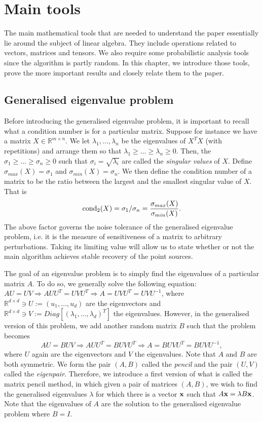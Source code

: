 \section{Main tools}
The main mathematical tools that are needed to understand the paper essentially lie around the subject of linear algebra. They include operations related to vectors, matrices and tensors. We also require some probabilistic analysis tools since the algorithm is partly random. In this chapter, we introduce those tools, prove the more important results and closely relate them to the paper. 
\subsection{Generalised eigenvalue problem}
Before introducing the generalised eigenvalue problem, it is important to recall what a condition number is for a particular matrix. Suppose for instance we have a matrix $X\in\mathbb{R}^{m\times n}$. We let $\lambda_1,\ldots,\lambda_n$ be the eigenvalues of $X^TX$ (with repetitions) and arrange them so that $\lambda_1\geq\ldots\geq\lambda_n\geq 0$. Then, the $\sigma_1\geq\ldots\geq\sigma_n\geq 0$ such that $\sigma_i=\sqrt{\lambda_i}$ are called the \textit{singular values} of $X$. Define $\sigma_{max}(X)=\sigma_1$ and $\sigma_{min}(X)=\sigma_n$. We then define the condition number of a matrix to be the ratio between the largest and the smallest singular value of $X$. That is 
\begin{equation}
    \operatorname*{cond_2}(X)=\sigma_1/\sigma_n=\frac{\sigma_{max}(X)}{\sigma_{min}(X)}.
\end{equation}
The above factor governs the noise tolerance of the generalised eigenvalue problem, i.e. it is the measure of sensitiveness of a matrix to arbitrary perturbations. Taking its limiting value will allow us to state whether or not the main algorithm achieves stable recovery of the point sources.\par
The goal of an eigenvalue problem is to simply find the eigenvalues of a particular matrix $A$. To do so, we generally solve the following equation: $AU=UV\Rightarrow AUU^T=UVU^T\Rightarrow A=UVU^T=UVU^{-1}$, where $\mathbb{R}^{d\times d}\ni U:=(u_1,\ldots,u_d)$ are the eigenvectors and $\mathbb{R}^{d\times d}\ni V:=Diag\left[(\lambda_1,\ldots,\lambda_d)^T\right]$ the eigenvalues. However, in the generalised version of this problem, we add another random matrix $B$ such that the problem becomes $$AU=BUV\Rightarrow AUU^T=BUVU^T\Rightarrow A=BUVU^T=BUVU^{-1},$$ where $U$ again are the eigenvectors and $V$ the eigenvalues. Note that $A$ and $B$ are both symmetric. We form the pair $(A,B)$ called the \textit{pencil} and the pair $(U,V)$ called the \textit{eigenpair}. Therefore, we introduce a first version of what is called the matrix pencil method, in which given a pair of matrices $(A,B)$, we wish to find the generalised eigenvalues $\lambda$ for which there is a vector ${\bf x}$ such that $A{\bf x}=\lambda B{\bf x}$. Note that the eigenvalues of $A$ are the solution to the generalised eigenvalue problem where $B=I$.
